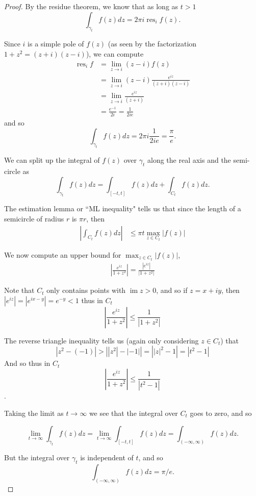 \documentclass{article}
\DeclareMathOperator{\im}{im}
\DeclareMathOperator{\res}{res}
\begin{document}
\begin{enumerate}
\begin{proof}
		By the residue theorem, we know that as long as $t > 1$ 
		\[ \int_{\gamma_t} f(z)dz = 2\pi i \res_{i} f(z) .\]
		
		Since $i$ is a simple pole of $f(z)$ (as seen by the factorization $1+z^2 = (z+i)(z-i)$), we can compute 
		\begin{align*}
			\res_i f &= \lim_{z \rightarrow i} (z-i) f(z)\\
			&= \lim_{z \rightarrow i} (z-i)\frac{e^{iz}}{(z+i)(z-i)}\\
			&= \lim_{z \rightarrow i}\frac{e^{iz}}{(z+i)} \\
			&= \frac{e^{-1}}{2i} = \frac{1}{2ie}
		\end{align*}
		and so 
		\[ \int_{\gamma_t} f(z)dz = 2\pi i\frac{1}{2ie} = \frac{\pi}{e}  .\]
		
		We can split up the integral of $f(z)$ over $\gamma_t$ along the real axis and the semi-circle as
		\[\int_{\gamma_t} f(z) dz = \int_{[-t,t]} f(z) dz + \int_{C_t} f(z) dz.\]
		
		The estimation lemma or ``ML inequality" tells us that since the length of a semicircle of radius $r$ is $\pi r$, then
		\begin{align*}
			\left | \int_{C_t} f(z) dz  \right | &\leq \pi t \max_{z \in C_t} |f(z)|
		\end{align*}
		
		We now compute an upper bound for $ \max_{z \in C_t} |f(z)|$, 
		\begin{align*}
			\left | \frac{e^{iz}}{1+z^2}\right | = \frac{ | e^{iz} | }{|1+z^2|}
		\end{align*}
		
		Note that $C_t$ only contains points with $\im z > 0$, and so if $z = x + i y$, then 
		${|e^{iz}| = |e^{ix - y}| = e^{-y} < 1}$
		thus in $C_t$
		\[\left | \frac{e^{iz}}{1+z^2}\right | \leq \frac{ 1 }{|1+z^2|}\]
		
		The reverse triangle inequality tells us (again only considering $z \in C_t$) that \[|z^2 - (-1) | > \left ||z^2| - | -1|\right| = \left ||z|^2 - 1\right| = |t^2 - 1|\]
		And so
		thus in $C_t$
		\[\left | \frac{e^{iz}}{1+z^2}\right | \leq \frac{ 1 }{|t^2-1|}\]. 
		
		Taking the limit as $t \rightarrow \infty$ we see that the integral over $C_t$ goes to zero, and so
		
		\[ \lim_{t \rightarrow \infty } \int_{\gamma_t} f(z)dz =  \lim_{t \rightarrow \infty} \int_{[-t,t]} f(z) dz = \int_{(-\infty, \infty)} f(z) dz .\]
		
		But the integral over $\gamma_t$ is independent of $t$, and so
		\[\int_{(-\infty, \infty)} f(z) dz = \pi/e.\]
		

\end{proof}
\end{enumerate}
\end{document}

